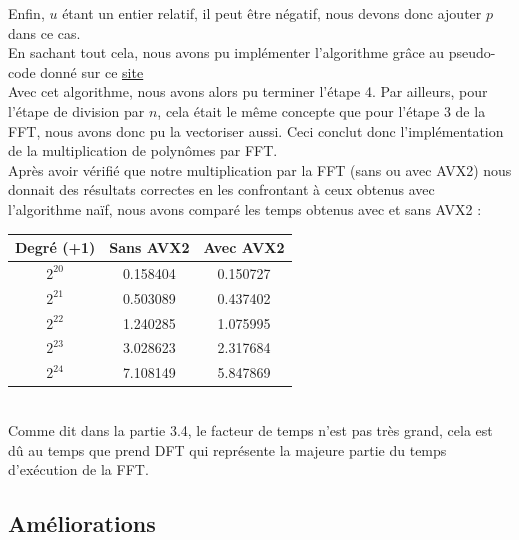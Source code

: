\documentclass[12pt, a4paper]{article}
\begin{document}
Enfin, $u$ étant un entier relatif, il peut être négatif, nous devons donc ajouter $p$ dans ce cas. \\
\indent En sachant tout cela, nous avons pu implémenter l'algorithme grâce au pseudo-code donné sur ce \href{https://www.dcode.fr/identite-bezout}{\underline{\color{blue}site}} \\
\indent Avec cet algorithme, nous avons alors pu terminer l'étape 4. Par ailleurs, pour l'étape de division par $n$, cela était le même concepte que pour l'étape 3 de la FFT, nous avons donc pu la vectoriser aussi. Ceci conclut donc l'implémentation de la multiplication de polynômes par FFT. \\
\indent Après avoir vérifié que notre multiplication par la FFT (sans ou avec AVX2) nous donnait des résultats correctes en les confrontant à ceux obtenus avec l'algorithme naïf, nous avons comparé les temps obtenus avec et sans AVX2 :

\begin{center}
\begin{tabular}{||c c c||}
\hline
Degré (+1) & Sans AVX2 & Avec AVX2 \\
\hline\hline
$2^{20}$ & 0.158404 & 0.150727 \\
\hline
$2^{21}$ & 0.503089 & 0.437402 \\
\hline
$2^{22}$ & 1.240285 & 1.075995 \\
\hline
$2^{23}$ & 3.028623 & 2.317684 \\
\hline
$2^{24}$ & 7.108149 & 5.847869 \\
\hline
\end{tabular}
\end{center}
{}
\ \\
\indent Comme dit dans la partie 3.4, le facteur de temps n'est pas très grand, cela est dû au temps que prend DFT qui représente la majeure partie du temps d'exécution de la FFT.

\subsection{Améliorations}
\end{document}
